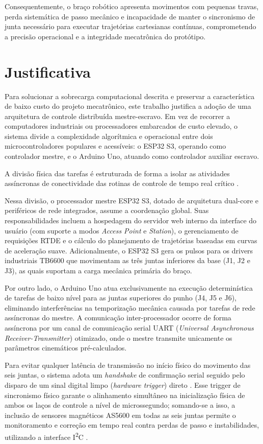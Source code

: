 Consequentemente, o braço robótico apresenta movimentos com pequenas travas, perda sistemática de passo mecânico e incapacidade de manter o sincronismo de junta necessário para executar trajetórias cartesianas contínuas, comprometendo a precisão operacional e a integridade mecatrônica do protótipo.

\section{Justificativa}
\label{sec:justificativa}

Para solucionar a sobrecarga computacional descrita e preservar a característica de baixo custo do projeto mecatrônico, este trabalho justifica a adoção de uma arquitetura de controle distribuída mestre-escravo. Em vez de recorrer a computadores industriais ou processadores embarcados de custo elevado, o sistema divide a complexidade algorítmica e operacional entre dois microcontroladores populares e acessíveis: o ESP32 S3, operando como controlador mestre, e o Arduino Uno, atuando como controlador auxiliar escravo.

A divisão física das tarefas é estruturada de forma a isolar as atividades assíncronas de conectividade das rotinas de controle de tempo real crítico \cite{siciliano2016springer}.

Nessa divisão, o processador mestre ESP32 S3, dotado de arquitetura dual-core e periféricos de rede integrados, assume a coordenação global. Suas responsabilidades incluem a hospedagem do servidor web interno da interface do usuário (com suporte a modos \textit{Access Point} e \textit{Station}), o gerenciamento de requisições RTDE e o cálculo do planejamento de trajetórias baseadas em curvas de aceleração suave. Adicionalmente, o ESP32 S3 gera os pulsos para os drivers industriais TB6600 que movimentam as três juntas inferiores da base (J1, J2 e J3), as quais suportam a carga mecânica primária do braço.

Por outro lado, o Arduino Uno atua exclusivamente na execução determinística de tarefas de baixo nível para as juntas superiores do punho (J4, J5 e J6), eliminando interferências na temporização mecânica causada por tarefas de rede assíncronas do mestre. A comunicação inter-processador ocorre de forma assíncrona por um canal de comunicação serial UART (\textit{Universal Asynchronous Receiver-Transmitter}) otimizado, onde o mestre transmite unicamente os parâmetros cinemáticos pré-calculados. 

Para evitar qualquer latência de transmissão no início físico do movimento das seis juntas, o sistema adota um \textit{handshake} de confirmação serial seguido pelo disparo de um sinal digital limpo (\textit{hardware trigger}) direto \cite{nissov2025simultaneous}. Esse trigger de sincronismo físico garante o alinhamento simultâneo na inicialização física de ambos os laços de controle a nível de microssegundo; somando-se a isso, a inclusão de sensores magnéticos AS5600 em todas as seis juntas permite o monitoramento e correção em tempo real contra perdas de passo e instabilidades, utilizando a interface I\textsuperscript{2}C \cite{tang2022research}.

